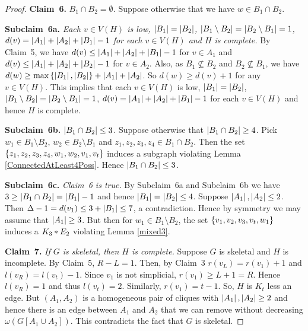 \begin{proof}
\textbf{Claim~6.} \textit{$B_1 \cap B_2 = \emptyset$.} Suppose otherwise that we have
$w \in B_1 \cap B_2$. 

\textbf{Subclaim~6a.} \textit{Each $v \in V(H)$ is low, $\left|B_1\right| = \left|B_2\right|$,
$\left|B_1 \setminus B_2\right| = \left|B_2 \setminus B_1\right| = 1$, $d(v) = \left|A_1\right| + \left|A_2\right| +
\left|B_1\right| - 1$ for each $v \in V(H)$ and $H$ is complete.} By Claim~5, we have
$d(v) \leq \left|A_1\right| + \left|A_2\right| + \left|B_1\right| - 1$ for $v \in A_1$ and $d(v) \leq \left|A_1\right| + \left|A_2\right| +
\left|B_2\right| - 1$ for $v \in A_2$.  Also, as $B_1 \not \subseteq B_2$ and $B_2
\not \subseteq B_1$, we have $d(w) \geq \max\left\{ \left|B_1\right|, \left|B_2\right| \right\} +
\left|A_1\right| + \left|A_2\right|$.  So $d(w) \geq d(v) + 1$ for any $v \in V(H)$.  This
implies that each $v \in V(H)$ is low, $\left|B_1\right| = \left|B_2\right|$, $\left|B_1
\setminus B_2\right| = \left|B_2 \setminus B_1\right| = 1$, $d(v) = \left|A_1\right| + \left|A_2\right| +
\left|B_1\right| - 1$ for each $v \in V(H)$ and hence $H$ is complete.  

\textbf{Subclaim~6b.} \textit{$\left|B_1 \cap B_2\right| \leq 3$.} Suppose otherwise that
$\left|B_1 \cap B_2\right| \geq 4$.  Pick $w_1 \in B_1 \setminus B_2$, $w_2 \in B_2
\setminus B_1$ and $z_1, z_2, z_3, z_4 \in B_1 \cap B_2$.  Then the set
$\left\{ z_1, z_2, z_3, z_4, w_1, w_2, v_1, v_t \right\}$ induces a subgraph violating Lemma
\ref{ConnectedAtLeast4Poss}.  Hence $\left|B_1 \cap B_2\right| \leq 3$.

\textbf{Subclaim~6c.} \textit{Claim~6 is true.}  By Subclaim~6a and Subclaim~6b we
have $3 \geq \left|B_1 \cap B_2\right| = \left|B_1\right| - 1$ and hence $\left|B_1\right| =
\left|B_2\right| \leq 4$.  Suppose $\left|A_1\right|, \left|A_2\right| \leq 2$.  Then $\Delta - 1
= d(v_1) \leq 3 + \left|B_1\right| \leq 7$, a contradiction.  Hence by symmetry we may assume
that $\left|A_1\right| \geq 3$.  But then for $w_1 \in B_1 \setminus B_2$, the
set $\left\{ v_1, v_2, v_3, v_t, w_1 \right\}$ induces a $K_3 \mbox{\hspace{2 pt}$\ast$\hspace{2 pt}} E_2$ violating Lemma
\ref{mixed3}.

\textbf{Claim~7.} \textit{If $G$ is skeletal, then $H$ is complete.}  Suppose $G$ is
skeletal and $H$ is incomplete.  By Claim~5, $R - L = 1$. Then, by Claim~3
$r(v_L) = r(v_1) + 1$ and $l(v_R) = l(v_t) - 1$.  Since $v_1$ is not simplicial,
$r(v_1) \geq L + 1 = R$.  Hence $l(v_R) = 1$ and thus $l(v_t) = 2$.  Similarly,
$r(v_1) = t - 1$.  So, $H$ is $K_t$ less an edge.  But $(A_1, A_2)$ is a
homogeneous pair of cliques with $\left|A_1\right|, \left|A_2\right| \geq 2$ and hence there
is an edge between $A_1$ and $A_2$ that we can remove without decreasing
$\omega(G[A_1 \cup A_2])$.  This contradicts the fact that $G$ is skeletal.
\end{proof}

